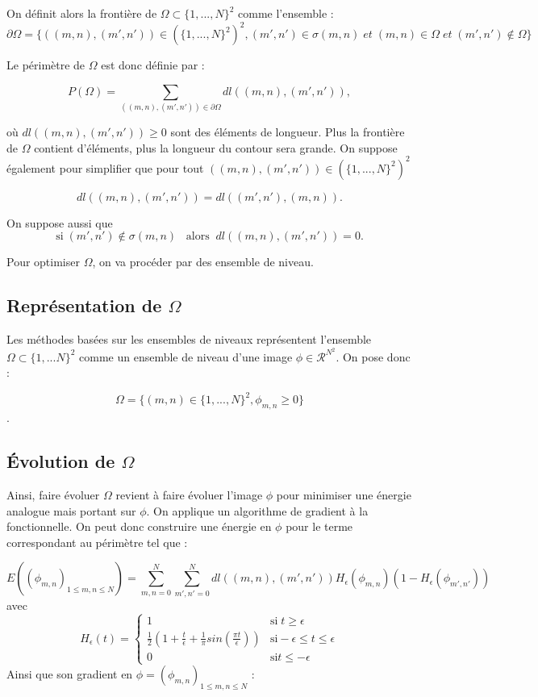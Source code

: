 \noindent
On définit alors la frontière de $\Omega \subset \{ 1,...,N\}^2$ comme l'ensemble : 
\[ \partial \Omega = \{ ((m,n),(m',n')) \in (\{ 1,...,N\}^2)^2, (m',n') \in \sigma (m,n) \; et \; (m,n)\in \Omega \; et \; (m',n') \notin \Omega \}\] 

\noindent
Le périmètre de $\Omega$ est donc définie par : 

\[ P(\Omega) = \sum \limits_{((m,n),(m',n')) \in \partial \Omega} dl((m,n),(m',n')),\] 

\noindent
où $ dl((m,n),(m',n')) \geq 0$ sont des éléments de longueur. Plus la frontière de $\Omega$ contient d'éléments, plus la longueur du contour sera grande. On suppose également pour simplifier que pour tout $((m,n), (m',n')) \in (\{ 1,...,N\}^2)^2$ 

\[ dl((m,n),(m',n')) = dl((m',n'),(m,n)).\]

\noindent
On suppose aussi que 
\[ \text{si} \; (m',n') \notin \sigma (m,n) \; \; \; \text{alors} \; \; dl((m,n),(m',n')) = 0.\]

\noindent
Pour optimiser $\Omega$, on va procéder par des ensemble de niveau.
 
\subsection{Représentation de \texorpdfstring{$\Omega$}{Lg}}

Les méthodes basées sur les ensembles de niveaux représentent l'ensemble $\Omega \subset \{1,...N\}^2$ comme un ensemble de niveau d'une image $\phi \in \mathcal{R}^{N^2}$. On pose donc :

\[ \Omega = \{ (m,n) \in \{1,...,N \}^2, \phi_{m,n} \geq 0 \} \].

\subsection{Évolution de \texorpdfstring{$\Omega$}{Lg}}

Ainsi, faire évoluer $\Omega$ revient à faire évoluer l'image $\phi$ pour minimiser une énergie analogue mais portant sur $\phi$. On applique un algorithme de gradient à la fonctionnelle. On peut donc construire une énergie en $\phi$  pour le terme correspondant au  périmètre tel que : 

\[ E ((\phi_{m,n})_{1 \leq m,n \leq N}) = \sum \limits_{m,n = 0}^N  \sum \limits_{m',n' = 0}^N  dl((m,n),(m',n')) H_{\epsilon} (\phi_{m,n}) ( 1 - H_{\epsilon}(\phi_{m',n'})) \] 
avec 
\[ H_{\epsilon} (t) = \left\{ \begin{matrix}
1 & \text{si} \; t \geq \epsilon \\
\frac{1}{2} (1 + \frac{t}{\epsilon} + \frac{1}{\pi}sin(\frac{\pi t}{\epsilon})) & \text{si} -\epsilon \leq t \leq \epsilon \\
0 & \text{si} t \leq - \epsilon 
\end{matrix} \right. \] 
Ainsi que son gradient en $\phi = (\phi_{m,n})_{1 \leq m,n \leq N}$ : 

